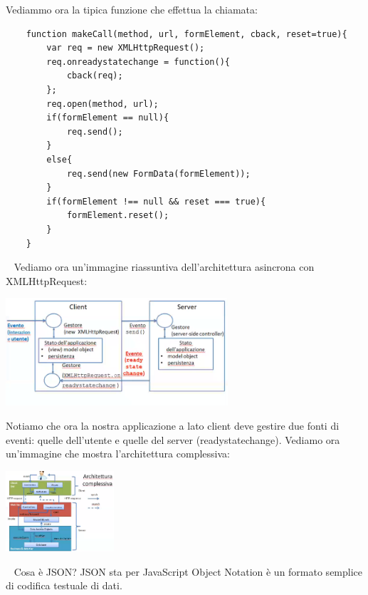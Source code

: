 Vediammo ora la tipica funzione che effettua la chiamata:
\begin{lstlisting}
    function makeCall(method, url, formElement, cback, reset=true){
        var req = new XMLHttpRequest();
        req.onreadystatechange = function(){
            cback(req);
        };
        req.open(method, url);
        if(formElement == null){
            req.send();
        }
        else{
            req.send(new FormData(formElement));
        }
        if(formElement !== null && reset === true){
            formElement.reset();
        }
    }
\end{lstlisting}
\ \newline
Vediamo ora un'immagine riassuntiva dell'architettura asincrona con XMLHttpRequest:
\begin{center}
    \includegraphics[height=4cm]{../lezione18/img1.PNG}
\end{center}
Notiamo che ora la nostra applicazione a lato client deve gestire due fonti di eventi: quelle dell'utente e quelle del server (readystatechange).\newline
Vediamo ora un'immagine che mostra l'architettura complessiva:
\begin{center}
    \includegraphics[height=3cm]{../lezione18/img2.PNG}
\end{center}
\ \newline  
Cosa è JSON? JSON sta per JavaScript Object Notation è un formato semplice di codifica testuale di dati. 